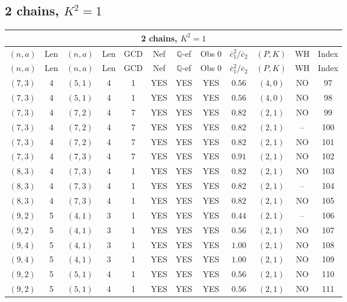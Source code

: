 \subsection{2 chains, $K^2 = 1$}
\begin{longtable}{|c|c|c|c|c|c|c|c|c|c|c|c|}
\hline
\multicolumn{12}{|c|}{2 chains, $K^2 = 1$}\\
\hline
$(n,a)$ & Len & $(n,a)$ & Len & GCD & Nef & $\mathbb Q$-ef & Obs 0 & $\overline c_1^2 / \overline c_2$ & $(P,K)$ & WH & Index\\
\hline
\endfirsthead

\hline
$(n,a)$ & Len & $(n,a)$ & Len & GCD & Nef & $\mathbb Q$-ef & Obs 0 & $\overline c_1^2 / \overline c_2$ & $(P,K)$ & WH & Index\\
\hline
\endhead
\hline
\endfoot

$(7,3)$ & 4 & $(5,1)$ & 4 & 1 & YES & YES & YES & $0.56$ & $(4,0)$ & NO & 97\\
$(7,3)$ & 4 & $(5,1)$ & 4 & 1 & YES & YES & YES & $0.56$ & $(4,0)$ & NO & 98\\
$(7,3)$ & 4 & $(7,2)$ & 4 & 7 & YES & YES & YES & $0.82$ & $(2,1)$ & NO & 99\\
$(7,3)$ & 4 & $(7,2)$ & 4 & 7 & YES & YES & YES & $0.82$ & $(2,1)$ & -- & 100\\
$(7,3)$ & 4 & $(7,2)$ & 4 & 7 & YES & YES & YES & $0.82$ & $(2,1)$ & NO & 101\\
$(7,3)$ & 4 & $(7,3)$ & 4 & 7 & YES & YES & YES & $0.91$ & $(2,1)$ & NO & 102\\
$(8,3)$ & 4 & $(7,3)$ & 4 & 1 & YES & YES & YES & $0.82$ & $(2,1)$ & NO & 103\\
$(8,3)$ & 4 & $(7,3)$ & 4 & 1 & YES & YES & YES & $0.82$ & $(2,1)$ & -- & 104\\
$(8,3)$ & 4 & $(7,3)$ & 4 & 1 & YES & YES & YES & $0.82$ & $(2,1)$ & NO & 105\\
$(9,2)$ & 5 & $(4,1)$ & 3 & 1 & YES & YES & YES & $0.44$ & $(2,1)$ & -- & 106\\
$(9,2)$ & 5 & $(4,1)$ & 3 & 1 & YES & YES & YES & $0.56$ & $(2,1)$ & NO & 107\\
$(9,4)$ & 5 & $(4,1)$ & 3 & 1 & YES & YES & YES & $1.00$ & $(2,1)$ & NO & 108\\
$(9,4)$ & 5 & $(4,1)$ & 3 & 1 & YES & YES & YES & $1.00$ & $(2,1)$ & NO & 109\\
$(9,2)$ & 5 & $(5,1)$ & 4 & 1 & YES & YES & YES & $0.56$ & $(2,1)$ & NO & 110\\
$(9,2)$ & 5 & $(5,1)$ & 4 & 1 & YES & YES & YES & $0.56$ & $(2,1)$ & NO & 111\\

\end{longtable}
